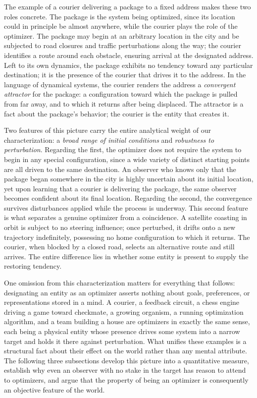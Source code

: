 \documentclass[11pt]{article}
\begin{document}
The example of a courier delivering a package to a fixed address makes these two roles concrete. The package is the system being optimized, since its location could in principle be almost anywhere, while the courier plays the role of the optimizer. The package may begin at an arbitrary location in the city and be subjected to road closures and traffic perturbations along the way; the courier identifies a route around each obstacle, ensuring arrival at the designated address. Left to its own dynamics, the package exhibits no tendency toward any particular destination; it is the presence of the courier that drives it to the address. In the language of dynamical systems, the courier renders the address a \emph{convergent attractor} for the package: a configuration toward which the package is pulled from far away, and to which it returns after being displaced. The attractor is a fact about the package's behavior; the courier is the entity that creates it.

Two features of this picture carry the entire analytical weight of our characterization: a \emph{broad range of initial conditions} and \emph{robustness to perturbation}. Regarding the first, the optimizer does not require the system to begin in any special configuration, since a wide variety of distinct starting points are all driven to the same destination. An observer who knows only that the package began somewhere in the city is highly uncertain about its initial location, yet upon learning that a courier is delivering the package, the same observer becomes confident about its final location. Regarding the second, the convergence survives disturbances applied while the process is underway. This second feature is what separates a genuine optimizer from a coincidence. A satellite coasting in orbit is subject to no steering influence; once perturbed, it drifts onto a new trajectory indefinitely, possessing no home configuration to which it returns. The courier, when blocked by a closed road, selects an alternative route and still arrives. The entire difference lies in whether some entity is present to supply the restoring tendency.

One omission from this characterization matters for everything that follows: designating an entity as an optimizer asserts nothing about goals, preferences, or representations stored in a mind. A courier, a feedback circuit, a chess engine driving a game toward checkmate, a growing organism, a running optimization algorithm, and a team building a house are optimizers in exactly the same sense, each being a physical entity whose presence drives some system into a narrow target and holds it there against perturbation. What unifies these examples is a structural fact about their effect on the world rather than any mental attribute. The following three subsections develop this picture into a quantitative measure, establish why even an observer with no stake in the target has reason to attend to optimizers, and argue that the property of being an optimizer is consequently an objective feature of the world.
\end{document}
